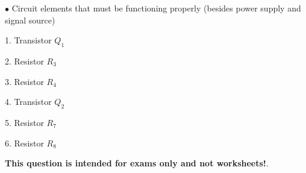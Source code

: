 \medskip
\goodbreak
\item{$\bullet$} Circuit elements that must be functioning properly (besides power supply and signal source)
\item{1.} Transistor $Q_1$
\item{2.} Resistor $R_3$
\item{3.} Resistor $R_4$
\item{4.} Transistor $Q_2$
\item{5.} Resistor $R_7$
\item{6.} Resistor $R_8$
\medskip







{\bf This question is intended for exams only and not worksheets!}.




